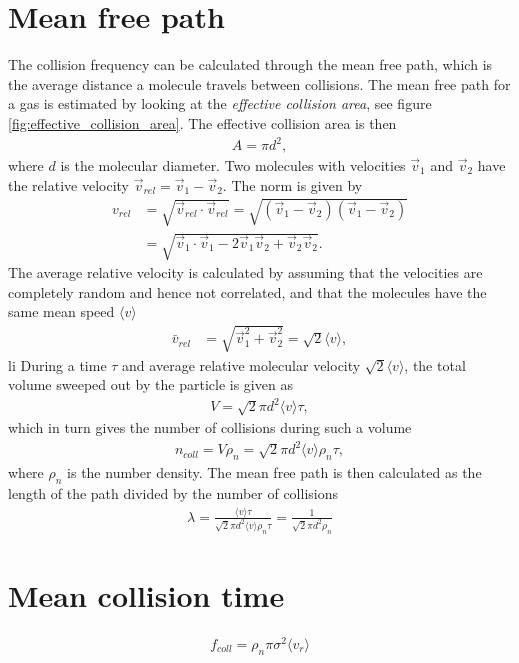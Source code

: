 \section{Mean free path}
\label{sec:mean_free_path_calculation}
The collision frequency can be calculated through the mean free path, which is the average distance a molecule travels between collisions. The mean free path for a gas is estimated by looking at the \textit{effective collision area}, see figure \ref{fig:effective_collision_area}. The effective collision area is then
\begin{align}
	A = \pi d^2,
\end{align}
where $d$ is the molecular diameter. Two molecules with velocities $\vec v_1$ and $\vec v_2$ have the relative velocity $\vec v_{rel} = \vec v_1 - \vec v_2$. The norm is given by
\begin{align}
	v_{rel} &= \sqrt{\vec v_{rel}\cdot \vec v_{rel} } = \sqrt{ (\vec v_1 - \vec v_2)(\vec v_1 - \vec v_2)}\\
	&= \sqrt{\vec v_1\cdot \vec v_1 - 2\vec v_1\vec v_2 + \vec v_2\vec v_2}.
\end{align}
The average relative velocity is calculated by assuming that the velocities are completely random and hence not correlated, and that the molecules have the same mean speed $\langle v\rangle$
\begin{align}
	\bar v_{rel} &= \sqrt{\vec v_1^2 + \vec v_2^2} = \sqrt 2 \langle v\rangle,
\end{align}li
During a time $\tau$ and average relative molecular velocity $\sqrt 2 \langle v\rangle$, the total volume sweeped out by the particle is given as
\begin{align}
	V = \sqrt 2 \pi d^2\langle v\rangle \tau,
\end{align}
which in turn gives the number of collisions during such a volume
\begin{align}
	\label{eq:num_collisions}
	n_{coll} = V\rho_n = \sqrt 2 \pi d^2\langle v\rangle \rho_n \tau,
\end{align}
where $\rho_n$ is the number density. The mean free path is then calculated as the length of the path divided by the number of collisions
\begin{align}
	\label{eq:mean_free_path}
	\lambda = \frac{\langle v\rangle \tau}{ \sqrt 2 \pi d^2\langle v\rangle \rho_n\tau} = \frac{1 }{ \sqrt 2 \pi d^2 \rho_n}
\end{align}
\section{Mean collision time}
\begin{align}
	\label{eq:coll_frequency}
	f_{coll} = \rho_n \pi \sigma^2 \langle v_r \rangle
\end{align}